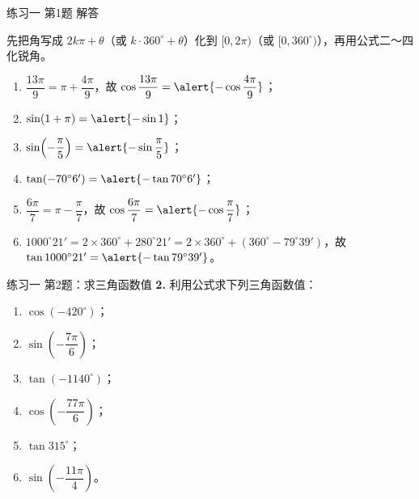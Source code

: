 \documentclass[10pt,aspectratio=169,serif]{beamer}
\begin{document}
\begin{frame}[t]{练习一 第1题 解答}
\begin{tcolorbox}[colback=orange!10,colframe=orange,title=\textbf{解}]
先把角写成 $2k\pi+\theta$（或 $k\cdot360^\circ+\theta$）化到 $[0,2\pi)$（或 $[0,360^\circ)$），再用公式二～四化锐角。
\begin{enumerate}[(1)]
  \item $\dfrac{13\pi}{9}=\pi+\dfrac{4\pi}{9}$，故 $\cos\dfrac{13\pi}{9}=\alert{-\cos\dfrac{4\pi}{9}}$；
  \item $\sin(1+\pi)=\alert{-\sin 1}$；
  \item $\sin\!\left(-\dfrac{\pi}{5}\right)=\alert{-\sin\dfrac{\pi}{5}}$；
  \item $\tan(-70^\circ6')=\alert{-\tan 70^\circ6'}$；
  \item $\dfrac{6\pi}{7}=\pi-\dfrac{\pi}{7}$，故 $\cos\dfrac{6\pi}{7}=\alert{-\cos\dfrac{\pi}{7}}$；
  \item $1000^\circ21'=2\times360^\circ+280^\circ21'=2\times360^\circ+(360^\circ-79^\circ39')$，故 $\tan1000^\circ21'=\alert{-\tan79^\circ39'}$。
\end{enumerate}
\end{tcolorbox}
\end{frame}

\begin{frame}[t]{练习一 第2题：求三角函数值}
\textbf{2.} 利用公式求下列三角函数值：
\begin{enumerate}[(1)]
  \item $\cos(-420^\circ)$； \qquad
  \item $\sin\!\left(-\dfrac{7\pi}{6}\right)$； \qquad
  \item $\tan(-1140^\circ)$；
  \item $\cos\!\left(-\dfrac{77\pi}{6}\right)$； \qquad
  \item $\tan 315^\circ$； \qquad
  \item $\sin\!\left(-\dfrac{11\pi}{4}\right)$。
\end{enumerate}
\end{frame}
\end{document}
